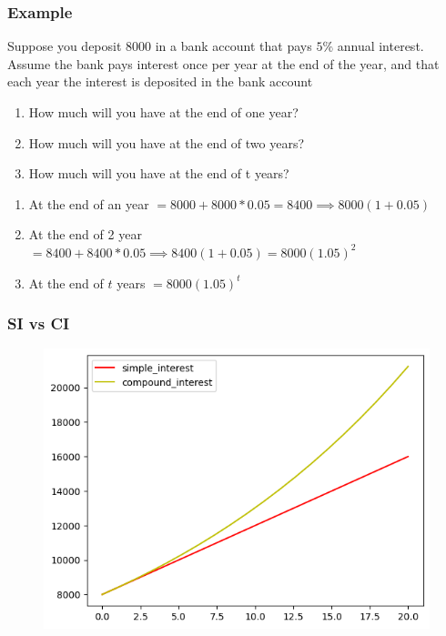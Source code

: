 \documentclass{beamer}
\begin{document}
    \begin{frame}
      \frametitle{Example}
      Suppose you deposit \(8000\) in a bank account that pays \(5\%\) annual interest. Assume the bank pays interest once per year at the end of the year, and that each year the interest is deposited in the bank account
      \begin{enumerate}
        \item How much will you have at the end of one year?
        \item How much will you have at the end of two years?
        \item How much will you have at the end of t years?
      \end{enumerate}
      \pause 
      \begin{enumerate}
        \item  At the end of an year \( =  8000 + 8000*0.05  = 8400 \implies 8000(1+0.05)\)
        \item  At the end of 2 year \( = 8400 + 8400*0.05 \implies 8400( 1 + 0.05) = 8000(1.05)^{2} \) 
        \item  At the end of \(t\) years \(= 8000(1.05)^{t}\)
      \end{enumerate}
     
    \end{frame}

    \begin{frame}
      \frametitle{SI vs CI}
      \begin{figure}
        \includegraphics[scale=0.5]{SI_vs_CI.png}
      \end{figure}
    \end{frame}
\end{document}
